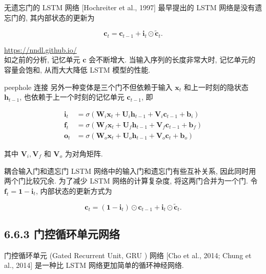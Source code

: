 \documentclass[10pt]{article}
\begin{document}
无遗忘门的 LSTM 网络 [Hochreiter et al., 1997] 最早提出的 LSTM 网络是没有遗忘门的, 其内部状态的更新为


\begin{equation*}
\boldsymbol{c}_{t}=\boldsymbol{c}_{t-1}+\boldsymbol{i}_{t} \odot \tilde{\boldsymbol{c}}_{t} . \tag{6.60}
\end{equation*}


\href{https://nndl.github.io/}{https://nndl.github.io/}\\
如之前的分析, 记忆单元 $\boldsymbol{c}$ 会不断增大. 当输入序列的长度非常大时, 记忆单元的容量会饱和, 从而大大降低 LSTM 模型的性能.

peephole 连接 另外一种变体是三个门不但依赖于输入 $\boldsymbol{x}_{t}$ 和上一时刻的隐状态 $\boldsymbol{h}_{t-1}$, 也依赖于上一个时刻的记忆单元 $\boldsymbol{c}_{t-1}$, 即


\begin{align*}
\boldsymbol{i}_{t} & =\sigma\left(\boldsymbol{W}_{i} \boldsymbol{x}_{t}+\boldsymbol{U}_{i} \boldsymbol{h}_{t-1}+\boldsymbol{V}_{i} \boldsymbol{c}_{t-1}+\boldsymbol{b}_{i}\right)  \tag{6.61}\\
\boldsymbol{f}_{t} & =\sigma\left(\boldsymbol{W}_{f} \boldsymbol{x}_{t}+\boldsymbol{U}_{f} \boldsymbol{h}_{t-1}+\boldsymbol{V}_{f} \boldsymbol{c}_{t-1}+\boldsymbol{b}_{f}\right)  \tag{6.62}\\
\boldsymbol{o}_{t} & =\sigma\left(\boldsymbol{W}_{o} \boldsymbol{x}_{t}+\boldsymbol{U}_{o} \boldsymbol{h}_{t-1}+\boldsymbol{V}_{o} \boldsymbol{c}_{t}+\boldsymbol{b}_{o}\right) \tag{6.63}
\end{align*}


其中 $\boldsymbol{V}_{i}, \boldsymbol{V}_{f}$ 和 $\boldsymbol{V}_{o}$ 为对角矩阵.

耦合输入门和遗忘门 LSTM 网络中的输入门和遗忘门有些互补关系, 因此同时用两个门比较冗余. 为了减少 LSTM 网络的计算复杂度, 将这两门合并为一个门. 令 $\boldsymbol{f}_{t}=\mathbf{1}-\boldsymbol{i}_{t}$, 内部状态的更新方式为


\begin{equation*}
\boldsymbol{c}_{t}=\left(\mathbf{1}-\boldsymbol{i}_{t}\right) \odot \boldsymbol{c}_{t-1}+\boldsymbol{i}_{t} \odot \tilde{\boldsymbol{c}}_{t} . \tag{6.64}
\end{equation*}


\subsection*{6.6.3 门控循环单元网络}
门控循环单元 (Gated Recurrent Unit, GRU ) 网络 [Cho et al., 2014; Chung et al., 2014] 是一种比 LSTM 网络更加简单的循环神经网络.
\end{document}
